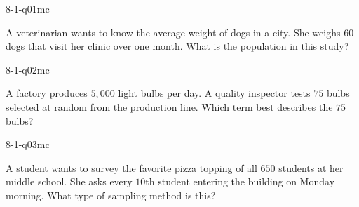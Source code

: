 

\begin{practiceQuestion}{8-1-q01}{mc}
\begin{questionText}
A veterinarian wants to know the average weight of dogs in a city. She weighs $60$ dogs that visit her clinic over one month. What is the population in this study?
\end{questionText}
\end{practiceQuestion}

\begin{practiceQuestion}{8-1-q02}{mc}
\begin{questionText}
A factory produces $5{,}000$ light bulbs per day. A quality inspector tests $75$ bulbs selected at random from the production line. Which term best describes the $75$ bulbs?
\end{questionText}
\end{practiceQuestion}

\begin{practiceQuestion}{8-1-q03}{mc}
\begin{questionText}
A student wants to survey the favorite pizza topping of all $650$ students at her middle school. She asks every $10$th student entering the building on Monday morning. What type of sampling method is this?
\end{questionText}
\end{practiceQuestion}

